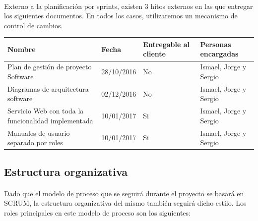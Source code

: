 \documentclass{article}
\begin{document}
            \paragraph{}
            Externo a la planificación por sprints, existen 3 hitos externos en las que entregar los siguientes documentos. En todos los casos, utilizaremos un mecanismo de control de cambios.

 			\begin{center}
         		\begin{tabular}{ | p{4.5cm} | p{1.8cm} | p{2cm} | p{2cm} |}		
                \hline
              	\rowcolor{Cornblue}
	        	\color{white} \textbf{Nombre} &
    	    	\color{white} \textbf{Fecha} & 
            	\color{white} \textbf{Entregable al cliente} &
                \color{white} \textbf{Personas encargadas} \\ \hline
                
              	
                Plan de gestión de proyecto Software & 28/10/2016 & No  & Ismael, Jorge y Sergio\\ \hline
                
              	Diagramas de arquitectura software & 02/12/2016  & No  & Ismael, Jorge y Sergio\\ \hline
                
              	Servicio Web con toda la funcionalidad implementada & 10/01/2017 & Si  & Ismael, Jorge y Sergio\\ \hline
                
              	Manuales de usuario separado por roles & 10/01/2017 & Si  & Ismael, Jorge y Sergio\\ \hline

              	\hline
          		\end{tabular}
        	\end{center}
		\subsection{Estructura organizativa}
        
        	\paragraph{}
            Dado que el modelo de proceso que se seguirá durante el proyecto se basará en SCRUM, la estructura organizativa del mismo también seguirá dicho estilo. Los roles principales en este modelo de proceso son los siguientes:
            
\end{document}
